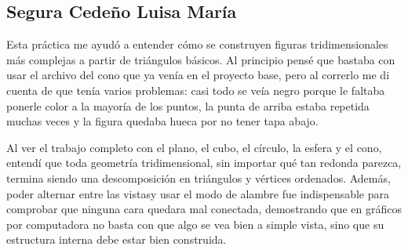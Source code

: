     
\subsection{Segura Cedeño Luisa María}

Esta práctica me ayudó a entender cómo se construyen figuras tridimensionales más complejas a partir de triángulos básicos. Al principio pensé que bastaba con usar el archivo del cono que ya venía en el proyecto base, pero al correrlo me di cuenta de que tenía varios problemas: casi todo se veía negro porque le faltaba ponerle color a la mayoría de los puntos, la punta de arriba estaba repetida muchas veces y la figura quedaba hueca por no tener tapa abajo.

Al ver el trabajo completo con el plano, el cubo, el círculo, la esfera y el cono, entendí que toda geometría tridimensional, sin importar qué tan redonda parezca, termina siendo una descomposición en triángulos y vértices ordenados. Además, poder alternar entre las vistasy usar el modo de alambre fue indispensable para comprobar que ninguna cara quedara mal conectada, demostrando que en gráficos por computadora no basta con que algo se vea bien a simple vista, sino que su estructura interna debe estar bien construida.

